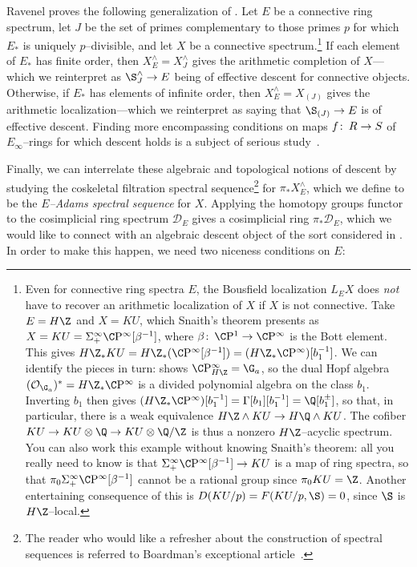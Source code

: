 \begin{remark}
Ravenel proves the following generalization of .  Let \(E\) be a connective ring spectrum, let \(J\) be the set of primes complementary to those primes \(p\) for which \(E_*\) is uniquely \(p\)--divisible, and let \(X\) be a connective spectrum.\footnote{Even for connective ring spectra \(E\), the Bousfield localization \(L_E X\) does \emph{not} have to recover an arithmetic localization of \(X\) if \(X\) is not connective.  Take \(E = H\Z\) and \(X = KU\), which Snaith's theorem presents as \(X = KU = \Susp^\infty_+ \CP^\infty[\beta^{-1}]\), where \(\beta\co \CP^1 \to \CP^\infty\) is the Bott element.  This gives \(H\Z_* KU = H\Z_*(\CP^\infty[\beta^{-1}]) = (H\Z_* \CP^\infty)[b_1^{-1}]\).  We can identify the pieces in turn:  shows \(\CP^\infty_{H\Z} = \G_a\), so the dual Hopf algebra \((\sheaf O_{\G_a})^* = H\Z_* \CP^\infty\) is a divided polynomial algebra on the class \(b_1\).  Inverting \(b_1\) then gives \((H\Z_* \CP^\infty)[b_1^{-1}] = \Gamma[b_1][b_1^{-1}] = \Q[b_1^\pm]\), so that, in particular, there is a weak equivalence \(H\Z \sm KU \to H\Q \sm KU\).  The cofiber \(KU \to KU \otimes \Q \to KU \otimes \Q/\Z\) is thus a nonzero \(H\Z\)--acyclic spectrum.  You can also work this example without knowing Snaith's theorem: all you really need to know is that \(\Susp^\infty_+ \CP^\infty[\beta^{-1}] \to KU\) is a map of ring spectra, so that \(\pi_0 \Susp^\infty_+ \CP^\infty[\beta^{-1}]\) cannot be a rational group since \(\pi_0 KU = \Z\).  Another entertaining consequence of this is \(D(KU/p) = F(KU/p, \S) = 0\), since $\S$ is $H\Z$--local.}  If each element of \(E_*\) has finite order, then \(X^\wedge_E = X^\wedge_J\) gives the arithmetic completion of \(X\)---which we reinterpret as \(\S^\wedge_J \to E\) being of effective descent for connective objects.  Otherwise, if \(E_*\) has elements of infinite order, then \(X^\wedge_E = X_{(J)}\) gives the arithmetic localization---which we reinterpret as saying that \(\S_{(J)} \to E\) is of effective descent.  Finding more encompassing conditions on maps \(f\colon\thinspace R \to S\) of \(E_\infty\)--rings for which descent holds is a subject of serious study~\cite[Appendix D]{LurieSAG}.
\end{remark}

Finally, we can interrelate these algebraic and topological notions of descent by studying the coskeletal filtration spectral sequence\footnote{The reader who would like a refresher about the construction of spectral sequences is referred to Boardman's exceptional article~\cite{BoardmanConditionallyConvergent}.} for \(\pi_* X^\wedge_E\), which we define to be the \textit{\(E\)--Adams spectral sequence} for \(X\).  Applying the homotopy groups functor to the cosimplicial ring spectrum \(\mathcal D_E\) gives a cosimplicial ring \(\pi_* \mathcal D_E\), which we would like to connect with an algebraic descent object of the sort considered in .  In order to make this happen, we need two niceness conditions on \(E\):

